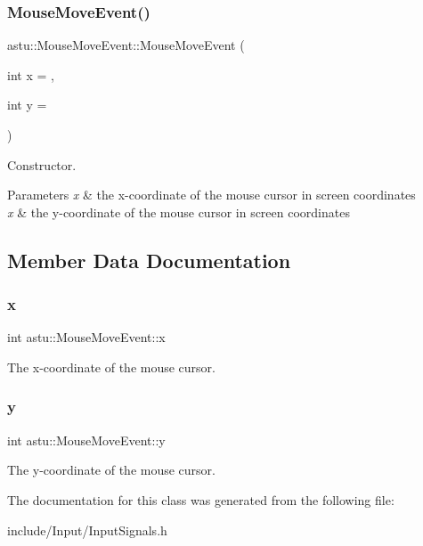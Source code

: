 \subsubsection{\texorpdfstring{Mouse\+Move\+Event()}{MouseMoveEvent()}}
{\footnotesize\ttfamily astu\+::\+Mouse\+Move\+Event\+::\+Mouse\+Move\+Event (\begin{DoxyParamCaption}\item[{int}]{x = {},  }\item[{int}]{y = {} }\end{DoxyParamCaption})\hspace{0.3cm}{\ttfamily [inline]}}

Constructor.


\begin{DoxyParams}{Parameters}
{\em x} & the x-\/coordinate of the mouse cursor in screen coordinates \\
\hline
{\em x} & the y-\/coordinate of the mouse cursor in screen coordinates \\
\hline
\end{DoxyParams}


\subsection{Member Data Documentation}
\mbox{\label{classastu_1_1MouseMoveEvent_aad28f3b8b9414a7620094bb0d9d1b721}} 
\subsubsection{\texorpdfstring{x}{x}}
{\footnotesize\ttfamily int astu\+::\+Mouse\+Move\+Event\+::x}

The x-\/coordinate of the mouse cursor. \mbox{\label{classastu_1_1MouseMoveEvent_aa058136ad49cd96594c7dc7b7b629c73}} 
\subsubsection{\texorpdfstring{y}{y}}
{\footnotesize\ttfamily int astu\+::\+Mouse\+Move\+Event\+::y}

The y-\/coordinate of the mouse cursor. 

The documentation for this class was generated from the following file\+:\begin{DoxyCompactItemize}
\item 
include/\+Input/Input\+Signals.\+h\end{DoxyCompactItemize}
